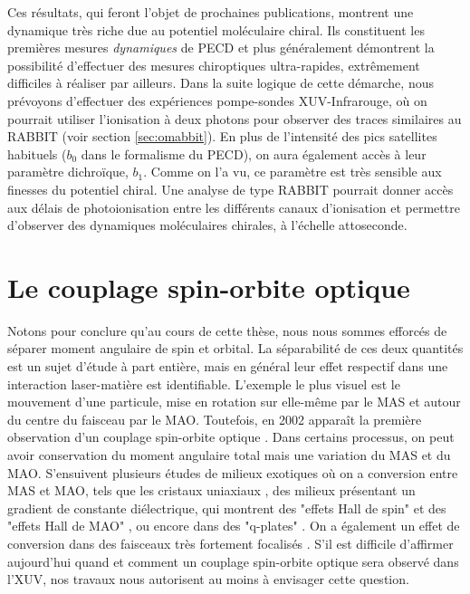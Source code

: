 Ces résultats, qui feront l'objet de prochaines publications, montrent une dynamique très riche due au potentiel moléculaire chiral. Ils constituent les premières mesures \textit{dynamiques} de PECD et plus généralement démontrent la possibilité d'effectuer des mesures chiroptiques ultra-rapides, extrêmement difficiles à réaliser par ailleurs. Dans la suite logique de cette démarche, nous prévoyons d'effectuer des expériences pompe-sondes XUV-Infrarouge, où on pourrait utiliser l'ionisation à deux photons pour observer des traces similaires au RABBIT (voir section \ref{sec:omabbit}). En plus de l'intensité des pics satellites habituels ($b_0$ dans le formalisme du PECD), on aura également accès à leur paramètre dichroïque, $b_1$. Comme on l'a vu, ce paramètre est très sensible aux finesses du potentiel chiral. Une analyse de type RABBIT pourrait donner accès aux délais de photoionisation entre les différents canaux d'ionisation et permettre d'observer des dynamiques moléculaires chirales, à l'échelle attoseconde. 

\section{Le couplage spin-orbite optique}
Notons pour conclure qu'au cours de cette thèse, nous nous sommes efforcés de séparer moment angulaire de spin et orbital. La séparabilité de ces deux quantités est un sujet d'étude à part entière, mais en général leur effet respectif dans une interaction laser-matière est identifiable. L'exemple le plus visuel est le mouvement d'une particule, mise en rotation sur elle-même par le MAS et autour du centre du faisceau par le MAO. Toutefois, en 2002 apparaît la première observation d'un couplage spin-orbite optique . Dans certains processus, on peut avoir conservation du moment angulaire total mais une variation du MAS et du MAO. S'ensuivent plusieurs études de milieux exotiques où on a conversion entre MAS et MAO, tels que les cristaux uniaxiaux , des milieux présentant un gradient de constante diélectrique, qui montrent des "effets Hall de spin"  et des "effets Hall de MAO" , ou encore dans des "q-plates" . On a également un effet de conversion dans des faisceaux très fortement focalisés . S'il est difficile d'affirmer aujourd'hui quand et comment un couplage spin-orbite optique sera observé dans l'XUV, nos travaux nous autorisent au moins à envisager cette question. 